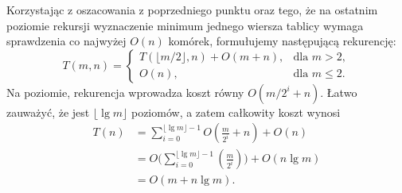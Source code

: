 \subsubsection{} %
Korzystając z oszacowania z poprzedniego punktu oraz tego, że na ostatnim poziomie rekursji wyznaczenie minimum jednego wiersza tablicy wymaga sprawdzenia co najwyżej $O(n)$ komórek, formułujemy następującą rekurencję:
\[
	T(m,n) =
	\begin{cases}
		T(\lfloor m/2\rfloor,n)+O(m+n), & \text{dla $m>2$}, \\
		O(n), & \text{dla $m\le2$}.
	\end{cases}
\]
Na  poziomie, rekurencja wprowadza koszt równy $O(m/2^i+n)$. Łatwo zauważyć, że jest $\lfloor\lg m\rfloor$ poziomów, a zatem całkowity koszt wynosi
\begin{align*}
	T(n) &= \sum_{i=0}^{\lfloor\lg m\rfloor-1}O\left(\frac{m}{2^i}+n\right)+O(n) \\
	&= O\biggl(\sum_{i=0}^{\lfloor\lg m\rfloor-1}\left(\frac{m}{2^i}\right)\biggr)+O(n\lg m) \\
	&= O(m+n\lg m).
\end{align*}

\endinput
